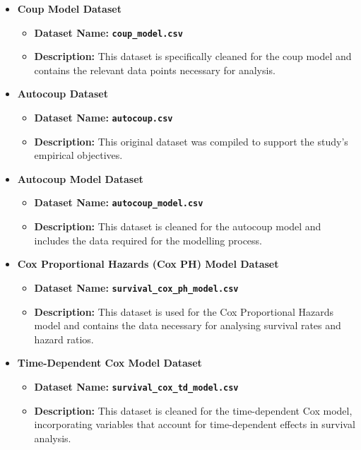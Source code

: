 \documentclass[
  12pt,
]{report}
\begin{document}
\begin{itemize}
\item
  \textbf{Coup Model Dataset}

  \begin{itemize}
  \item
    \textbf{Dataset Name:} \textbf{\texttt{coup\_model.csv}}
  \item
    \textbf{Description:} This dataset is specifically cleaned for the
    coup model and contains the relevant data points necessary for
    analysis.
  \end{itemize}
\item
  \textbf{Autocoup Dataset}

  \begin{itemize}
  \item
    \textbf{Dataset Name:} \textbf{\texttt{autocoup.csv}}
  \item
    \textbf{Description:} This original dataset was compiled to support
    the study's empirical objectives.
  \end{itemize}
\item
  \textbf{Autocoup Model Dataset}

  \begin{itemize}
  \item
    \textbf{Dataset Name:} \textbf{\texttt{autocoup\_model.csv}}
  \item
    \textbf{Description:} This dataset is cleaned for the autocoup model
    and includes the data required for the modelling process.
  \end{itemize}
\item
  \textbf{Cox Proportional Hazards (Cox PH) Model Dataset}

  \begin{itemize}
  \item
    \textbf{Dataset Name:}
    \textbf{\texttt{survival\_cox\_ph\_model.csv}}
  \item
    \textbf{Description:} This dataset is used for the Cox Proportional
    Hazards model and contains the data necessary for analysing survival
    rates and hazard ratios.
  \end{itemize}
\item
  \textbf{Time-Dependent Cox Model Dataset}

  \begin{itemize}
  \item
    \textbf{Dataset Name:}
    \textbf{\texttt{survival\_cox\_td\_model.csv}}
  \item
    \textbf{Description:} This dataset is cleaned for the time-dependent
    Cox model, incorporating variables that account for time-dependent
    effects in survival analysis.
  \end{itemize}
\end{itemize}
\end{document}
